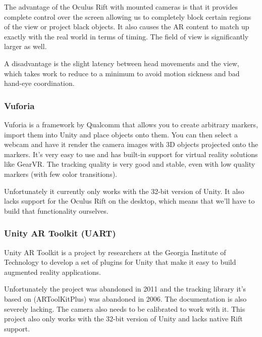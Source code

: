 			The advantage of the Oculus Rift with mounted cameras is that it
			provides complete control over the screen allowing us to completely
			block certain regions of the view or project black objects. It also
			causes the AR content to match up exactly with the real world in
			terms of timing. The field of view is significantly larger as well.

			A disadvantage is the slight latency between head movements and the
			view, which takes work to reduce to a minimum to avoid motion
			sickness and bad hand-eye coordination.

			\subsubsection{Vuforia} \label{sssec:vuforia}
				Vuforia is a framework by Qualcomm that allows you to create
				arbitrary markers, import them into Unity and place objects onto
				them. \cite{vuforia} You can then select a webcam and have it
				render the camera images with 3D objects projected onto the
				markers. It's very easy to use and has built-in support for
				virtual reality solutions like GearVR. The tracking quality is
				very good and stable, even with low quality markers (with few
				color transitions).

				Unfortunately it currently only works with the 32-bit version of
				Unity. It also lacks support for the Oculus Rift on the desktop,
				which means that we'll have to build that functionality
				ourselves.

			\subsubsection{Unity AR Toolkit (UART)} \label{sssec:uart}
				Unity AR Toolkit \cite{uart} is a project by researchers at the
				Georgia Institute of Technology to develop a set of plugins for
				Unity that make it easy to build augmented reality applications.

				Unfortunately the project was abandoned in 2011 and the tracking
				library it's based on (ARToolKitPlus) was abandoned in 2006. The
				documentation is also severely lacking. The camera also needs to
				be calibrated to work with it. This project also only works with
				the 32-bit version of Unity and lacks native Rift support.

